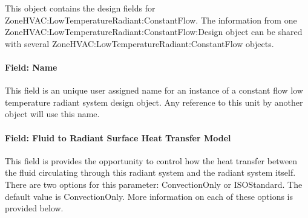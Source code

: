 This object contains the design fields for ZoneHVAC:LowTemperatureRadiant:ConstantFlow. The information from one ZoneHVAC:LowTemperatureRadiant:ConstantFlow:Design object can be shared with several ZoneHVAC:LowTemperatureRadiant:ConstantFlow objects.

\paragraph{Field: Name}\label{ConstFlowDesignName}

This field is an unique user assigned name for an instance of a constant flow low temperature radiant system design object. Any reference to this unit by another object will use this name.

\paragraph{Field: Fluid to Radiant Surface Heat Transfer Model}\label{field-fluid-to-radiant-surface-heat-transfer-model-001}

This field is provides the opportunity to control how the heat transfer between the fluid circulating through this radiant system and the radiant system itself.  There are two options for this parameter: ConvectionOnly or ISOStandard.  The default value is ConvectionOnly.  More information on each of these options is provided below.

